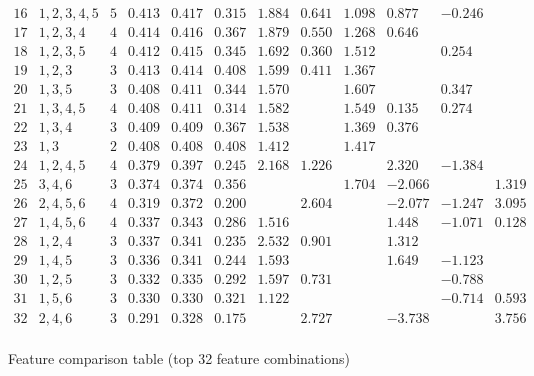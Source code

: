 \documentclass[oneside,10pt]{book}
\begin{document}
\begin{table}
\[\begin{array}{lcc|rrr|rrrrrr}
16	&	1,2,3,4,5	&	5	&	0.413	&	0.417	&	0.315	&	1.884	&	0.641	&	1.098	&	0.877	&	-0.246	&		\\
17	&	1,2,3,4	&	4	&	0.414	&	0.416	&	0.367	&	1.879	&	0.550	&	1.268	&	0.646	&		&		\\
18	&	1,2,3,5	&	4	&	0.412	&	0.415	&	0.345	&	1.692	&	0.360	&	1.512	&		&	0.254	&		\\
19	&	1,2,3	&	3	&	0.413	&	0.414	&	0.408	&	1.599	&	0.411	&	1.367	&		&		&		\\
20	&	1,3,5	&	3	&	0.408	&	0.411	&	0.344	&	1.570	&		&	1.607	&		&	0.347	&		\\
21	&	1,3,4,5	&	4	&	0.408	&	0.411	&	0.314	&	1.582	&		&	1.549	&	0.135	&	0.274	&		\\
22	&	1,3,4	&	3	&	0.409	&	0.409	&	0.367	&	1.538	&		&	1.369	&	0.376	&		&		\\
23	&	1,3	&	2	&	0.408	&	0.408	&	0.408	&	1.412	&		&	1.417	&		&		&		\\
24	&	1,2,4,5	&	4	&	0.379	&	0.397	&	0.245	&	2.168	&	1.226	&		&	2.320	&	-1.384	&		\\
25	&	3,4,6	&	3	&	0.374	&	0.374	&	0.356	&		&		&	1.704	&	-2.066	&		&	1.319	\\
26	&	2,4,5,6	&	4	&	0.319	&	0.372	&	0.200	&		&	2.604	&		&	-2.077	&	-1.247	&	3.095	\\
27	&	1,4,5,6	&	4	&	0.337	&	0.343	&	0.286	&	1.516	&		&		&	1.448	&	-1.071	&	0.128	\\
28	&	1,2,4	&	3	&	0.337	&	0.341	&	0.235	&	2.532	&	0.901	&		&	1.312	&		&		\\
29	&	1,4,5	&	3	&	0.336	&	0.341	&	0.244	&	1.593	&		&		&	1.649	&	-1.123	&		\\
30	&	1,2,5	&	3	&	0.332	&	0.335	&	0.292	&	1.597	&	0.731	&		&		&	-0.788	&		\\
31	&	1,5,6	&	3	&	0.330	&	0.330	&	0.321	&	1.122	&		&		&		&	-0.714	&	0.593	\\
32	&	2,4,6	&	3	&	0.291	&	0.328	&	0.175	&		&	2.727	&		&	-3.738	&		&	3.756	\\
\end{array}
\]
\caption{\label{tabrr00}Feature comparison table (top 32 feature combinations)}
\end{table}
\end{document}
